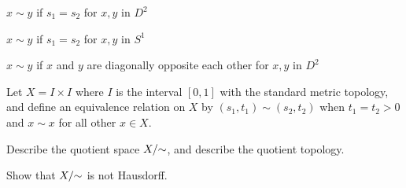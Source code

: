 \ba
\item $x \sim y$ if $s_1=s_2$ for $x, y$ in $D^2$

\item $x \sim y$ if $s_1=s_2$ for $x, y$ in $S^1$

\item $x \sim y$ if $x$ and $y$ are diagonally opposite each other for $x, y$ in $D^2$

\ea


\begin{comment}

\ExerciseSolution

\ba

\item This is the line segment $[-1,1]$.

\item This is like a cylinder, but with closed ends. Think of a calzone that has no filling.

\item Every line through the origin has two equivalent parts - the points on the line above the $y$-axis are equivalent to the corresponding points on the line below the $y$-axis. So we can think of the space $D^2/\ssim$ as the upper half disk consisting of the line segments from the origin to points on $S^1$. 


\ea

\end{comment}

\item Let $X = I \times I$ where $I$ is the interval $[0,1]$ with the standard metric topology, and define an equivalence relation on $X$ by $(s_1, t_1) \sim (s_2,t_2)$ when $t_1 = t_2 > 0$ and $x \sim x$ for all other $x \in X$. 
\ba
\item Describe the quotient space $X/\hspace{-1mm}\sim$, and describe the quotient topology.

\item Show that $X/\hspace{-1mm}\sim$ is not Hausdorff.

\ea

